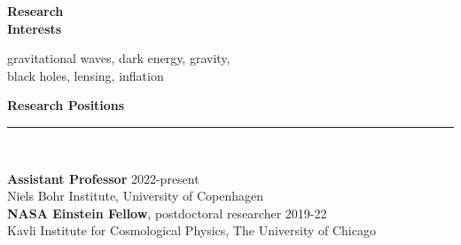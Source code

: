 \documentclass[11pt,a4paper]{article}
\newcommand{\secsize}{0.20\linewidth}
\newcommand{\contsize}{0.80\linewidth}
\newcommand{\secsizesmall}{0.05\linewidth}
\newcommand{\contsizelong}{0.95\linewidth}
\newcommand{\sectionsep}{12pt}
\begin{document}
\vspace{5pt}
\begin{minipage}[t]{\secsize}
\begin{flushleft}
\bf{Research \\ Interests}
\end{flushleft}
\end{minipage}
\begin{minipage}[t]{\contsize}
\begin{flushleft}
gravitational waves, dark energy, gravity, \\ black holes, lensing, inflation\\
\end{flushleft}
\end{minipage}

\vspace{\sectionsep}
\textbf{Research Positions} \vspace{-8pt}\\ {\rule{\linewidth}{0.6pt}}\vspace{5pt}\\
\begin{minipage}[t]{\secsizesmall}
\begin{flushleft}
\end{flushleft}
\end{minipage}
\begin{minipage}[t]{\contsizelong}
\begin{flushleft}
\textbf{Assistant Professor}    \hfill 2022-present \\
Niels Bohr Institute, University of Copenhagen  \\
\vspace{5pt}
\textbf{NASA Einstein Fellow}, postdoctoral researcher   \hfill 2019-22 \\
Kavli Institute for Cosmological Physics, The University of Chicago
\end{flushleft}
\end{minipage}
\end{document}
